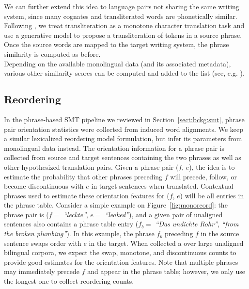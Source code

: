 \documentclass[11pt]{article}
\newcommand{\mnote}[1]{\marginpar{%
  \vskip-\baselineskip
  \raggedright\footnotesize
  \itshape\hrule\smallskip\tiny{#1}\par\smallskip\hrule}}
\newcommand{\mtodo}[1]{\mnote{\textcolor{red}{#1}}}
\newcommand{\secref}[1]{Section~\ref{#1}}
\newcommand{\figref}[1]{Figure~\ref{#1}}
\newcommand{\emq}[1]{\emph{``#1''}}
\begin{document}
We can further extend this idea to language pairs not sharing the same writing system, since many cognates and transliterated words are phonetically similar.  Following \cite{Virga:2003,Irvine:2010a}, we treat transliteration as a monotone character translation task and use a generative model\mtodo{Argue that enough training data is easy to get} to propose a transliteration of tokens in a source phrase.  Once the source words are mapped to the target writing system, the phrase similarity is computed as before.\\

Depending on the available monolingual data (and its associated metadata), various other similarity scores can be computed and added to the list (see, e.g. \cite{Schafer:2002}).

\subsection{Reordering} \label{sect:order}

In the phrase-based SMT pipeline we reviewed in \secref{sect:bckg:smt}, phrase pair orientation statistics were collected from induced word alignments.  We keep a similar lexicalized reordering model formulation, but infer its parameters from monolingual data instead.  The orientation information for a phrase pair is collected from source and target sentences containing the two phrases as well as other hypothesized translation pairs.  Given a phrase pair ($f$, $e$), the idea is to estimate the probability that other phrases preceding $f$ will precede, follow, or become discontinuous with $e$ in target sentences when translated.  Contextual phrases used to estimate these orientation features for ($f$, $e$) will be all entries in the phrase table.  Consider a simple example on \figref{fig:monoreord}: the phrase pair is ($f =$ \emq{leckte}, $e =$ \emq{leaked}), and a given pair of unaligned sentences also contains a phrase table entry ($f_{b} =$ \emq{Das undichte Rohr}, \emq{from the broken plumbing}).  In this example, the phrase $f_{b}$ preceding $f$ in the source sentence swaps order with $e$ in the target.  When collected a over large unaligned bilingual corpora, we expect the swap, monotone, and discontinuous counts to provide good estimates for the orientation features.  Note that multiple phrases may immediately precede $f$ and appear in the phrase table; however, we only use the longest one to collect reordering counts.\mtodo{Explain why?}
\end{document}
